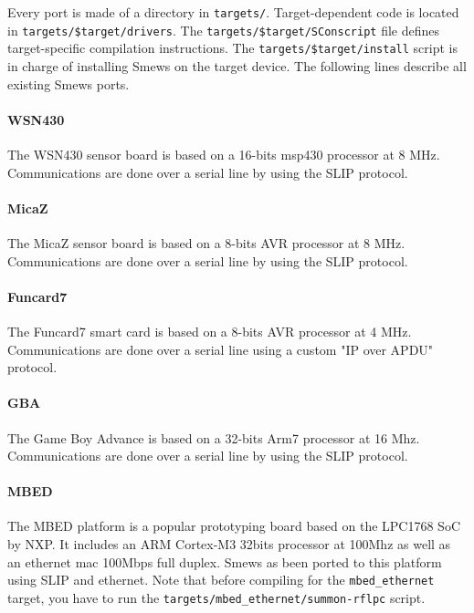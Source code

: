 \documentclass{report}
\begin{document}
Every port is made of a directory in \verb+targets/+. Target-dependent code is located in \verb+targets/$target/drivers+. The \verb+targets/$target/SConscript+ file defines target-specific compilation instructions. The \verb+targets/$target/install+ script is in charge of installing Smews on the target device. The following lines describe all existing Smews ports.

\paragraph{WSN430}

The WSN430 sensor board is based on a 16-bits msp430 processor at 8 MHz. Communications are done over a serial line by using the SLIP protocol.

\paragraph{MicaZ}

The MicaZ sensor board is based on a 8-bits AVR processor at 8 MHz. Communications are done over a serial line by using the SLIP protocol.

\paragraph{Funcard7}

The Funcard7 smart card is based on a 8-bits AVR processor at 4 MHz. Communications are done over a serial line using a custom "IP over APDU" protocol.

\paragraph{GBA}

The Game Boy Advance is based on a 32-bits Arm7 processor at 16 Mhz. Communications are done over a serial line by using the SLIP protocol.

\paragraph{MBED}

The MBED platform is a popular prototyping board based on the LPC1768 SoC by NXP. It includes an ARM Cortex-M3 32bits processor at 100Mhz as well as an ethernet mac 100Mbps full duplex. Smews as been ported to this platform using SLIP and ethernet. Note that before compiling for the \verb+mbed_ethernet+ target, you have to run the \verb+targets/mbed_ethernet/summon-rflpc+ script.
\end{document}
